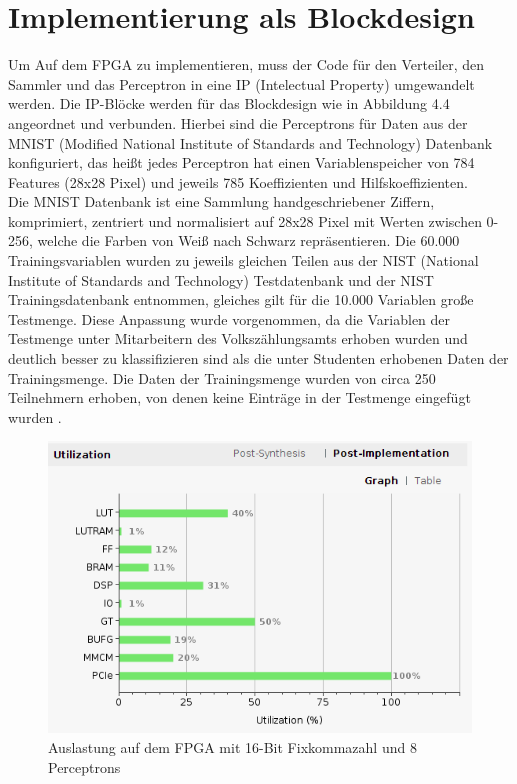 \section{Implementierung als Blockdesign}
Um Auf dem FPGA zu implementieren, muss der Code für den Verteiler, den Sammler und das Perceptron in eine IP (Intelectual Property) umgewandelt werden. Die IP-Blöcke werden für das Blockdesign wie in Abbildung 4.4 angeordnet und verbunden. Hierbei sind die Perceptrons für Daten aus der MNIST (Modified National Institute of Standards and Technology) Datenbank konfiguriert, das heißt jedes Perceptron hat einen Variablenspeicher von 784 Features (28x28 Pixel) und jeweils 785 Koeffizienten und Hilfskoeffizienten.\\
Die MNIST Datenbank ist eine Sammlung handgeschriebener Ziffern, komprimiert, zentriert und normalisiert auf 28x28 Pixel mit Werten zwischen 0-256, welche die Farben von Weiß nach Schwarz repräsentieren. Die 60.000 Trainingsvariablen wurden zu jeweils gleichen Teilen aus der NIST (National Institute of Standards and Technology) Testdatenbank und der NIST Trainingsdatenbank entnommen, gleiches gilt für die 10.000 Variablen große Testmenge. Diese Anpassung wurde vorgenommen, da die Variablen der Testmenge unter Mitarbeitern des Volkszählungsamts erhoben wurden und deutlich besser zu klassifizieren sind als die unter Studenten erhobenen Daten der Trainingsmenge. Die Daten der Trainingsmenge wurden von circa 250 Teilnehmern erhoben, von denen keine Einträge in der Testmenge eingefügt wurden \cite{MNIST}.\\
\begin{figure}[ht]
\centering
\includegraphics[scale=1.0]{bilder/auslastung1}
\caption{Auslastung auf dem FPGA mit 16-Bit Fixkommazahl und 8 Perceptrons}
\end{figure}\\
